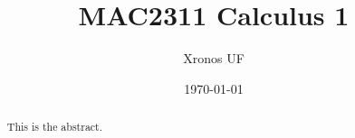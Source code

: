 \documentclass{xourse}
\title{MAC2311 Calculus 1}
\author{Xronos UF}
\date{\today}
\begin{document}
\begin{abstract}
	This is the abstract.
\end{abstract}

\maketitle

\tableofcontents
{}
\end{document}
